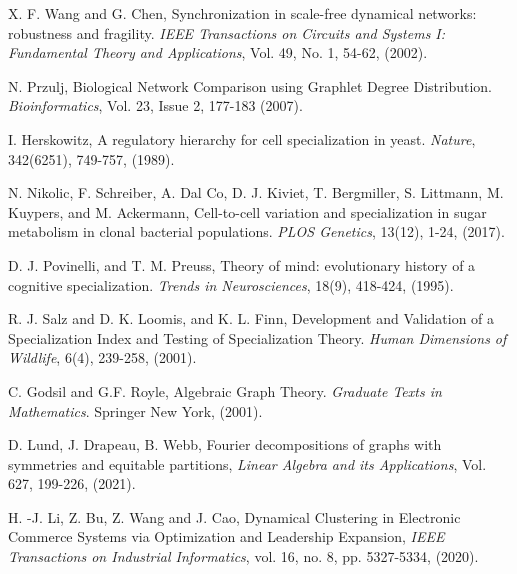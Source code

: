 \documentclass[12pt]{thesis}
\begin{document}
\begin{thebibliography}{99}
 X. F. Wang and G. Chen, Synchronization in scale-free dynamical networks: robustness and fragility. \textit{IEEE Transactions on Circuits and Systems I: Fundamental Theory and Applications}, Vol. 49, No. 1, {54-62}, (2002).

 N. Przulj, Biological Network Comparison using Graphlet Degree Distribution. \textit{Bioinformatics}, Vol. 23, Issue 2, {177-183} (2007).

 I. Herskowitz, A regulatory hierarchy for cell specialization in yeast. \textit{Nature}, 342(6251), 749-757, (1989).

 N. Nikolic, F. Schreiber, A. Dal Co, D. J. Kiviet, T. Bergmiller, S. Littmann, M. Kuypers, and M. Ackermann, Cell-to-cell variation and specialization in sugar metabolism in clonal bacterial populations. \textit{PLOS Genetics}, 13(12), 1-24, (2017).

 D. J. Povinelli, and T. M. Preuss, Theory of mind: evolutionary history of a cognitive specialization. \textit{Trends in Neurosciences}, 18(9), 418-424, (1995).

 R. J. Salz and D. K. Loomis, and K. L. Finn, Development and Validation of a Specialization Index and Testing of Specialization Theory. \textit{Human Dimensions of Wildlife}, 6(4), 239-258, (2001).

 C. Godsil and G.F. Royle, Algebraic Graph Theory. \textit{Graduate Texts in Mathematics}. Springer New York, (2001).

 D. Lund, J. Drapeau, B. Webb, Fourier decompositions of graphs with symmetries and equitable partitions, \textit{Linear Algebra and its Applications}, Vol. 627, {199-226}, (2021).

 {H. -J. Li, Z. Bu, Z. Wang and J. Cao, Dynamical Clustering in Electronic Commerce Systems via Optimization and Leadership Expansion, \textit{IEEE Transactions on Industrial Informatics}, vol. 16, no. 8, pp. 5327-5334, (2020).}
\end{thebibliography}

\end{document}
